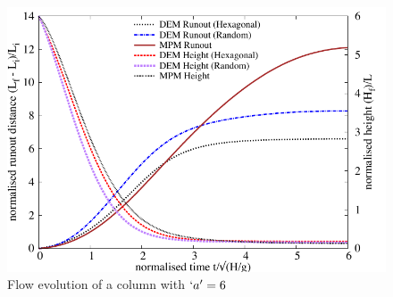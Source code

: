 \begin{figure}[tbhp]
\centering
\includegraphics[width=\textwidth]{flowa6}
\caption{Flow evolution of a column with $`a'=6$}
\label{fig:flowa6}
\end{figure}

